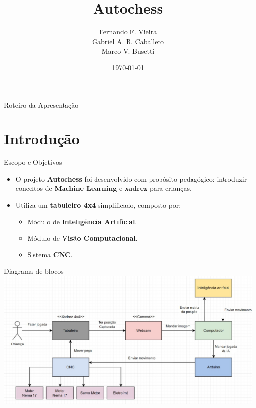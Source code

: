\documentclass{beamer}
\title{Autochess}
\author{Fernando F. Vieira \\ Gabriel A. B. Caballero \\ Marco V. Busetti}
\institute{Oficina de Integração 1 (ELEX20) \\ Engenharia de Computação - UTFPR}
\date{\today}
\begin{document}
\frame{\titlepage}

\begin{frame}{Roteiro da Apresentação}
  \tableofcontents
\end{frame}

\section{Introdução}

\begin{frame}{Escopo e Objetivos}
\begin{itemize}
    \item O projeto \textbf{Autochess} foi desenvolvido com propósito pedagógico: introduzir conceitos de \textbf{Machine Learning} e \textbf{xadrez} para crianças.
    
    \item Utiliza um \textbf{tabuleiro 4x4} simplificado, composto por:
        \begin{itemize}
        \item Módulo de \textbf{Inteligência Artificial}.
        \item Módulo de \textbf{Visão Computacional}.
        \item Sistema \textbf{CNC}.
    \end{itemize}
\end{itemize}
\end{frame}



\begin{frame}[plain]{Diagrama de blocos}
  \centering
\includegraphics[width=0.95\paperwidth,keepaspectratio]{images/diagrama.jpeg}
\end{frame}
\end{document}
